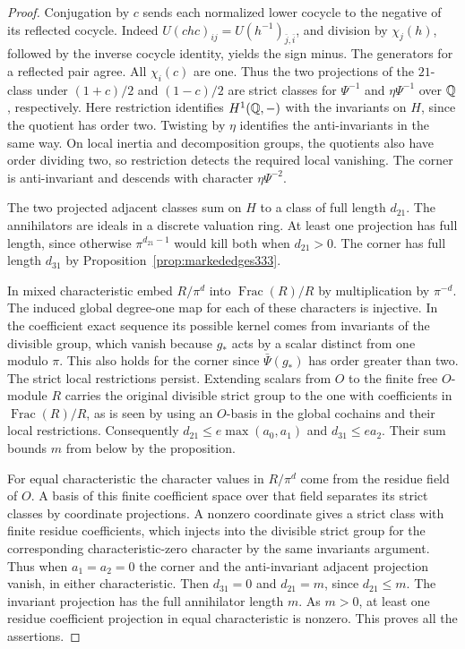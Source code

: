 \documentclass[a4paper,11pt]{article}
\theoremstyle{definition}
\theoremstyle{remark}
\numberwithin{equation}{section}
\begin{document}
\begin{proof}
Conjugation by \(c\) sends each normalized lower cocycle to the
negative of its reflected cocycle. Indeed
\(U(chc)_{ij}=U(h^{-1})_{\bar j,\bar i}\), and division by
\(\chi_j(h)\), followed by the inverse cocycle identity, yields
the sign minus. The generators for a reflected pair agree. All
\(\chi_i(c)\) are one. Thus the two projections of the \(21\)-class
under \((1+c)/2\) and \((1-c)/2\) are strict classes for
\(\Psi^{-1}\) and \(\eta\Psi^{-1}\) over \(\mathbb Q\), respectively.
Here restriction identifies \(H^1(\mathbb Q,-)\) with the invariants on
\(H\), since the quotient has order two. Twisting by \(\eta\)
identifies the anti-invariants in the same way. On local inertia
and decomposition groups, the quotients also have order dividing
two, so restriction detects the required local vanishing. The corner
is anti-invariant and descends with character \(\eta\Psi^{-2}\).

The two projected adjacent classes sum on \(H\) to a class of full
length \(d_{21}\). The annihilators are ideals in a discrete valuation
ring. At least one projection has full length, since otherwise
\(\pi^{d_{21}-1}\) would kill both when \(d_{21}>0\). The corner has
full length \(d_{31}\) by Proposition~\ref{prop:markededges333}.

In mixed characteristic embed \(R/\pi^d\) into
\(\operatorname{Frac}(R)/R\) by multiplication by \(\pi^{-d}\).
The induced global degree-one map for each of these characters is
injective. In the coefficient exact sequence its possible kernel comes
from invariants of the divisible group, which vanish because
\(g_*\) acts by a scalar distinct from one modulo \(\pi\).
This also holds for the corner since \(\bar\Psi(g_*)\) has order
greater than two. The strict local restrictions persist. Extending
scalars from \(O\) to the finite free \(O\)-module \(R\) carries the
original divisible strict group to the one with coefficients in
\(\operatorname{Frac}(R)/R\), as is seen by using an \(O\)-basis in
the global cochains and their local restrictions. Consequently
\(d_{21}\le e\max(a_0,a_1)\) and \(d_{31}\le ea_2\). Their sum
bounds \(m\) from below by the proposition.

For equal characteristic the character values in \(R/\pi^d\) come
from the residue field of \(O\). A basis of this finite coefficient
space over that field separates its strict classes by coordinate
projections. A nonzero coordinate gives a strict class with finite
residue coefficients, which injects into the divisible strict group
for the corresponding characteristic-zero character by the same
invariants argument. Thus when \(a_1=a_2=0\) the corner and the
anti-invariant adjacent projection vanish, in either characteristic.
Then \(d_{31}=0\) and \(d_{21}=m\), since \(d_{21}\le m\).
The invariant projection has the full annihilator length \(m\).
As \(m>0\), at least one residue coefficient projection in equal
characteristic is nonzero. This proves all the assertions.
\end{proof}
\end{document}
